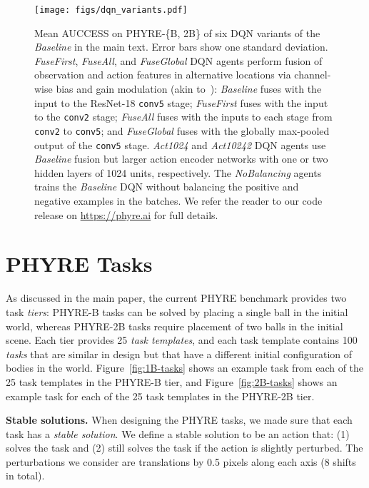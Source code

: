 \documentclass{article}
\begin{document}
\begin{figure}[!h]
\centering
\texttt{[image: figs/dqn\_variants.pdf]}
  \caption{Mean AUCCESS on PHYRE-\{B, 2B\} of six DQN variants of the \emph{Baseline} in the main text. Error bars show one standard deviation. \emph{FuseFirst}, \emph{FuseAll}, and \emph{FuseGlobal} DQN agents perform fusion of observation and action features in alternative locations via channel-wise bias and gain modulation (akin to~\cite{perez2018film}): \emph{Baseline} fuses with the input to the ResNet-18 \texttt{conv5} stage; \emph{FuseFirst} fuses with the input to the \texttt{conv2} stage; \emph{FuseAll} fuses with the inputs to each stage from \texttt{conv2} to \texttt{conv5}; and \emph{FuseGlobal} fuses with the globally max-pooled output of the \texttt{conv5} stage. \emph{Act1024} and \emph{Act10242} DQN agents use \emph{Baseline} fusion but larger action encoder networks with one or two hidden layers of 1024 units, respectively. The \emph{NoBalancing} agents trains the \emph{Baseline} DQN without balancing the positive and negative examples in the batches. We refer the reader to our code release on \url{https://phyre.ai} for full details.}
\label{fig:dqn_variants}
\end{figure}


\section{PHYRE Tasks}

As discussed in the main paper, the current PHYRE benchmark provides two task \emph{tiers}:
PHYRE-B tasks can be solved by placing a single ball in the initial world, whereas PHYRE-2B tasks require placement of two balls in the initial scene. Each tier provides 25 \emph{task templates},
and each task template contains 100 \emph{tasks} that are similar in design but that have a different initial configuration of bodies in the world. Figure~\ref{fig:1B-tasks} shows an example task from each of the 25 task templates in
the PHYRE-B tier, and Figure~\ref{fig:2B-tasks} shows an example task for each of
the 25 task templates in the PHYRE-2B tier.

\noindent\textbf{Stable solutions.} When designing the PHYRE tasks, we made sure that each task has a \emph{stable solution}. We define a stable solution to be an action that: (1) solves the task and (2) still solves the task if the action is slightly perturbed. The perturbations we consider are translations by 0.5 pixels along each axis (8 shifts in total).
\end{document}
